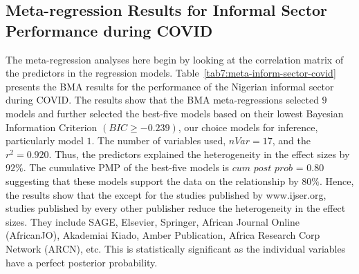 \documentclass[12pt, english]{article}
\begin{document}
    \subsection{Meta-regression Results for Informal Sector Performance during COVID}\label{subsec:meta-regression-results-informal-sector-performance-during-covid}
    The meta-regression analyses here begin by looking at the correlation matrix of the predictors in the regression models. Table~\ref{tab7:meta-inform-sector-covid} presents the BMA results for the performance of the Nigerian informal sector during COVID. The results show that the BMA meta-regressions selected $9$ models and further selected the best-five models based on their lowest Bayesian Information Criterion $(BIC \geq -0.239)$, our choice models for inference, particularly model $1$. The number of variables used, $nVar = 17$, and the $r^2 = 0.920$. Thus, the predictors explained the heterogeneity in the effect sizes by $92\%$. The cumulative PMP of the best-five models is $cum$ $post$ $prob$ = $0.80$ suggesting that these models support the data on the relationship by $80\%$. Hence, the results show that the except for the studies published by www.ijser.org, studies published by every other publisher reduce the heterogeneity in the effect sizes. They include SAGE, Elsevier, Springer, African Journal Online (AfricanJO), Akademiai Kiado, Amber Publication, Africa Research Corp Network (ARCN), etc. This is statistically significant as the individual variables have a perfect posterior probability.
\end{document}
